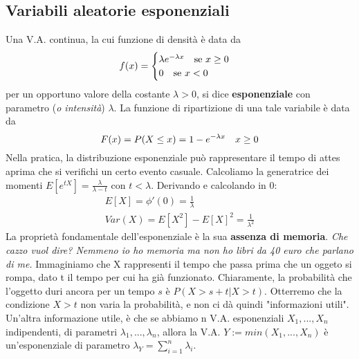 \documentclass[11pt]{article}
\begin{document}
\subsection{Variabili aleatorie esponenziali}
Una V.A. continua, la cui funzione di densità è data da 
\begin{displaymath}
    f(x)=\begin{cases}
        \lambda e^{-\lambda x} \hspace{10px}\mbox{se }x\ge 0\\ 
        0\hspace{10px}\mbox{se }x<0
    \end{cases}
\end{displaymath}
per un opportuno valore della costante $\lambda>0$, si dice \textbf{esponenziale} con parametro (\textit{o intensità}) $\lambda$.
La funzione di ripartizione di una tale variabile è data da 
\begin{displaymath}
    F(x) = P(X\le x) = 1-e^{-\lambda x}\hspace{10px} x\ge 0
\end{displaymath}
Nella pratica, la distribuzione esponenziale può rappresentare il tempo di attes aprima che si verifichi un certo evento casuale. Calcoliamo la generatrice dei momenti $E[e^{tX}] = \frac{\lambda}{\lambda-t}$ con $t<\lambda$. Derivando e calcolando in 0:
\begin{gather*}
    E[X]=\phi'(0)=\frac{1}{\lambda}\\ 
    Var(X) = E[X^2] - E[X]^2 = \frac{1}{\lambda^2}
\end{gather*}
La proprietà fondamentale dell'esponenziale è la sua \textbf{assenza di memoria}. \textit{Che cazzo vuol dire? Nemmeno io ho memoria ma non ho libri da 40 euro che parlano di me.} Immaginiamo che X rappresenti il tempo che passa prima che un oggeto si rompa, dato t il tempo per cui ha già funzionato. Chiaramente, la probabilità che l'oggetto duri ancora per un tempo $s$ è $P(X>s+t | X>t)$. Otterremo che la condizione $X>t$ non varia la probabilità, e non ci dà quindi "informazioni utili".
Un'altra informazione utile, è che se abbiamo n V.A. esponenziali $X_1,...,X_n$ indipendenti, di parametri $\lambda_1,...,\lambda_n$, allora la V.A. $Y:=min(X_1,...,X_n)$ è un'esponenziale di parametro $\lambda_Y=\sum_{i=1}^n \lambda_i$.
\end{document}
